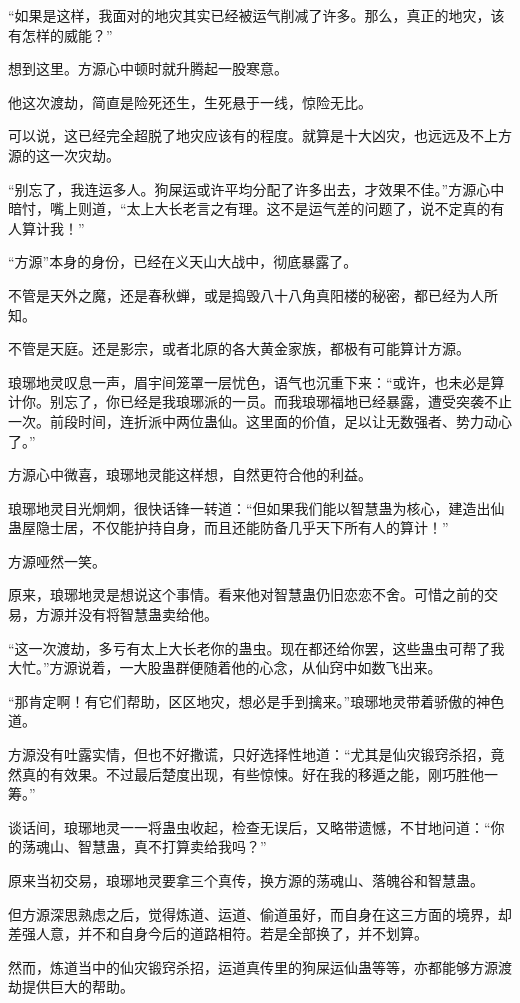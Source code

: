 \begin{this_body}
“如果是这样，我面对的地灾其实已经被运气削减了许多。那么，真正的地灾，该有怎样的威能？”

想到这里。方源心中顿时就升腾起一股寒意。

他这次渡劫，简直是险死还生，生死悬于一线，惊险无比。

可以说，这已经完全超脱了地灾应该有的程度。就算是十大凶灾，也远远及不上方源的这一次灾劫。

“别忘了，我连运多人。狗屎运或许平均分配了许多出去，才效果不佳。”方源心中暗忖，嘴上则道，“太上大长老言之有理。这不是运气差的问题了，说不定真的有人算计我！”

“方源”本身的身份，已经在义天山大战中，彻底暴露了。

不管是天外之魔，还是春秋蝉，或是捣毁八十八角真阳楼的秘密，都已经为人所知。

不管是天庭。还是影宗，或者北原的各大黄金家族，都极有可能算计方源。

琅琊地灵叹息一声，眉宇间笼罩一层忧色，语气也沉重下来：“或许，也未必是算计你。别忘了，你已经是我琅琊派的一员。而我琅琊福地已经暴露，遭受突袭不止一次。前段时间，连折派中两位蛊仙。这里面的价值，足以让无数强者、势力动心了。”

方源心中微喜，琅琊地灵能这样想，自然更符合他的利益。

琅琊地灵目光炯炯，很快话锋一转道：“但如果我们能以智慧蛊为核心，建造出仙蛊屋隐士居，不仅能护持自身，而且还能防备几乎天下所有人的算计！”

方源哑然一笑。

原来，琅琊地灵是想说这个事情。看来他对智慧蛊仍旧恋恋不舍。可惜之前的交易，方源并没有将智慧蛊卖给他。

“这一次渡劫，多亏有太上大长老你的蛊虫。现在都还给你罢，这些蛊虫可帮了我大忙。”方源说着，一大股蛊群便随着他的心念，从仙窍中如数飞出来。

“那肯定啊！有它们帮助，区区地灾，想必是手到擒来。”琅琊地灵带着骄傲的神色道。

方源没有吐露实情，但也不好撒谎，只好选择性地道：“尤其是仙灾锻窍杀招，竟然真的有效果。不过最后楚度出现，有些惊悚。好在我的移遁之能，刚巧胜他一筹。”

谈话间，琅琊地灵一一将蛊虫收起，检查无误后，又略带遗憾，不甘地问道：“你的荡魂山、智慧蛊，真不打算卖给我吗？”

原来当初交易，琅琊地灵要拿三个真传，换方源的荡魂山、落魄谷和智慧蛊。

但方源深思熟虑之后，觉得炼道、运道、偷道虽好，而自身在这三方面的境界，却差强人意，并不和自身今后的道路相符。若是全部换了，并不划算。

然而，炼道当中的仙灾锻窍杀招，运道真传里的狗屎运仙蛊等等，亦都能够方源渡劫提供巨大的帮助。


\end{this_body}
